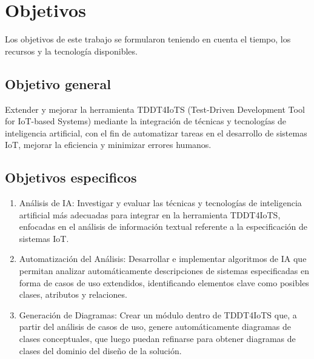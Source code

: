 \section{Objetivos}\label{section:objetivos}

Los objetivos de este trabajo se formularon teniendo en cuenta el tiempo, los recursos y la tecnología disponibles.

\subsection{Objetivo general}

Extender y mejorar la herramienta TDDT4IoTS (Test-Driven Development Tool for IoT-based Systems) mediante la integración de técnicas y tecnologías de inteligencia artificial, con el fin de automatizar tareas en el desarrollo de sistemas IoT, mejorar la eficiencia y minimizar errores humanos.

\subsection{Objetivos especificos}

\begin{enumerate}
	\item Análisis de IA: Investigar y evaluar las técnicas y tecnologías de inteligencia artificial más adecuadas para integrar en la herramienta TDDT4IoTS, enfocadas en el análisis de información textual referente a la especificación de sistemas IoT.
	
	\item Automatización del Análisis: Desarrollar e implementar algoritmos de IA que permitan analizar automáticamente descripciones de sistemas especificadas en forma de casos de uso extendidos, identificando elementos clave como posibles clases, atributos y relaciones.
	
	\item Generación de Diagramas: Crear un módulo dentro de TDDT4IoTS que, a partir del análisis de casos de uso, genere automáticamente diagramas de clases conceptuales, que luego puedan refinarse para obtener diagramas de clases del dominio del diseño de la solución.

\end{enumerate}